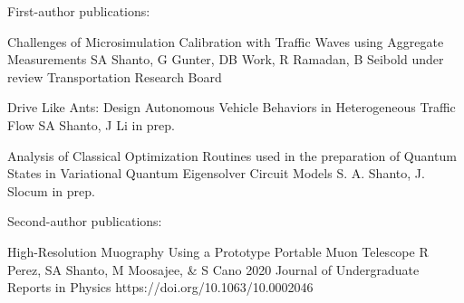 
\begin{cvpublications}{First-author publications:}

    {Challenges of Microsimulation Calibration with Traffic Waves using Aggregate Measurements}	
    {SA Shanto, G Gunter, DB Work, R Ramadan, B Seibold}
    {under review}
    {Transportation Research Board}
    {}

    {Drive Like Ants: Design Autonomous Vehicle Behaviors in Heterogeneous Traffic Flow}	
    {SA Shanto, J Li}
    {in prep.}
    {}
    {}

    {Analysis of Classical Optimization Routines used in the preparation of Quantum States in Variational Quantum Eigensolver Circuit Models}	
    {S. A. Shanto, J. Slocum}	
    {in prep.}
    {}
    {}


\end{cvpublications}

\begin{cvpublications}{Second-author publications:}


    {High-Resolution Muography Using a Prototype Portable Muon Telescope}	
    {R Perez, SA Shanto, M Moosajee, \& S Cano}
    {2020}
    {Journal of Undergraduate Reports in Physics}
    {https://doi.org/10.1063/10.0002046}

\end{cvpublications}


